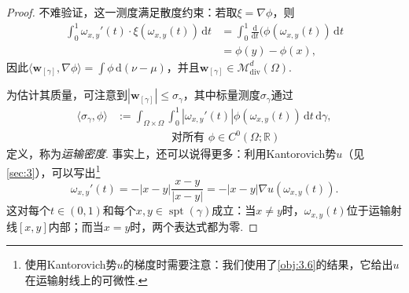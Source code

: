 \begin{proof}
不难验证，这一测度满足散度约束：若取$\xi=\nabla\phi$，则
\begin{equation*}
\begin{aligned}
 \int_0^1\omega_{x,y}'(t)\cdot\xi(\omega_{x,y}(t))\,\mathrm dt
 &=\int_0^1\frac{\mathrm d}{\mathrm dt}
                  \bigl(\phi(\omega_{x,y}(t))\,\mathrm dt\\
 &=\phi(y)-\phi(x),
\end{aligned}
\end{equation*}
因此$\langle\mathbf w_{[\gamma]},\nabla\phi\rangle=\int\phi\,\mathrm d(\nu-\mu)$，并且$\mathbf w_{[\gamma]}\in\mathscr M^d_{\mathrm{div}}(\Omega)$.

为估计其质量，可注意到$|\mathbf w_{[\gamma]}|\leq\sigma_\gamma$，其中标量测度$\sigma_\gamma$通过
\begin{equation*}
\begin{aligned}
 \langle\sigma_\gamma,\phi\rangle
 &:=\int_{\Omega\times\Omega}\int_0^1
       |\omega_{x,y}'(t)|\phi(\omega_{x,y}(t))\,\mathrm dt\,\mathrm d\gamma,\\
 &\hspace{5em}\text{对所有 }\phi\in C^0(\Omega;\mathbb R)
\end{aligned}
\end{equation*}
定义，称为\emph{运输密度}. 事实上，还可以说得更多：利用Kantorovich势$u$（见\autoref{sec:3}），可以写出\footnote{使用Kantorovich势$u$的梯度时需要注意：我们使用了\autoref{obj:3.6}的结果，它给出$u$在运输射线上的可微性.}
\[
 \omega_{x,y}'(t)=-|x-y|\frac{x-y}{|x-y|}
              =-|x-y|\nabla u(\omega_{x,y}(t)).
\]
这对每个$t\in(0,1)$和每个$x,y\in\operatorname{spt}(\gamma)$成立：当$x\neq y$时，$\omega_{x,y}(t)$位于运输射线$[x,y]$内部；而当$x=y$时，两个表达式都为零.


\end{proof}
